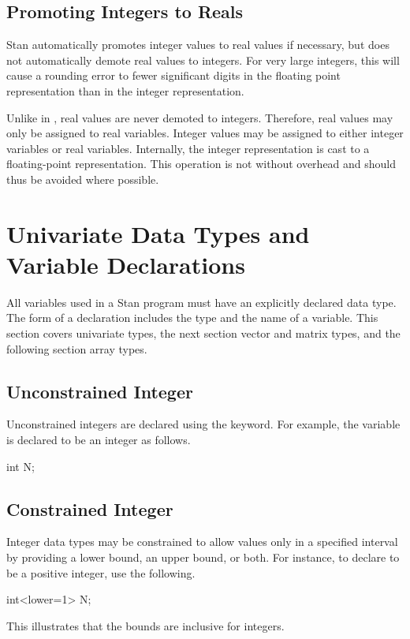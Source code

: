\subsection{Promoting Integers to Reals}

Stan automatically promotes integer values to real values if
necessary, but does not automatically demote real values to integers.
For very large integers, this will cause a rounding error to fewer
significant digits in the floating point representation than in the
integer representation.

Unlike in \Cpp, real values are never demoted to integers.  Therefore,
real values may only be assigned to real variables.  Integer values
may be assigned to either integer variables or real variables.
Internally, the integer representation is cast to a floating-point
representation.  This operation is not without overhead and should
thus be avoided where possible.


\section{Univariate Data Types and Variable Declarations}

All variables used in a Stan program must have an explicitly declared
data type.  The form of a declaration includes the type and the name
of a variable.  This section covers univariate types, the next section
vector and matrix types, and the following section array types.

\subsection{Unconstrained Integer}

Unconstrained integers are declared using the  keyword.
For example, the variable  is declared to be an integer as follows.
%
\begin{stancode}
int N;
\end{stancode}
%

\subsection{Constrained Integer}

Integer data types may be constrained to allow values only in a
specified interval by providing a lower bound, an upper bound, or
both.  For instance, to declare  to be a positive integer, use
the following.
%
\begin{stancode}
int<lower=1> N;
\end{stancode}
%
This illustrates that the bounds are inclusive for integers.

